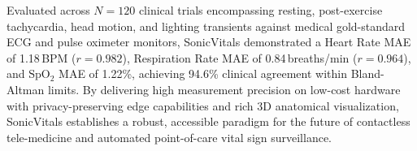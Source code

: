 \documentclass[journal]{IEEEtran}
\begin{document}
Evaluated across $N=120$ clinical trials encompassing resting, post-exercise tachycardia, head motion, and lighting transients against medical gold-standard ECG and pulse oximeter monitors, SonicVitals demonstrated a Heart Rate MAE of 1.18\,BPM ($r = 0.982$), Respiration Rate MAE of 0.84\,breaths/min ($r = 0.964$), and $\mathrm{SpO_2}$ MAE of 1.22\%, achieving 94.6\% clinical agreement within Bland-Altman limits. By delivering high measurement precision on low-cost hardware with privacy-preserving edge capabilities and rich 3D anatomical visualization, SonicVitals establishes a robust, accessible paradigm for the future of contactless tele-medicine and automated point-of-care vital sign surveillance.

\makeatletter
\def\thebibliography#1{\section*{\refname}%
\addcontentsline{toc}{section}{\refname}%
\footnotesize\vskip 0.2\baselineskip%
\list{\@biblabel{\@arabic\c@enumiv}}%
{\settowidth\labelwidth{\@biblabel{#1}}%
\leftmargin\labelwidth
\advance\leftmargin\labelsep\relax
\itemsep -1.4pt\relax
\parsep 0pt\relax
\usecounter{enumiv}%
\let\p@enumiv\@empty
\renewcommand\theenumiv{\@arabic\c@enumiv}}%
\let\@IEEElatexbibitem\bibitem%
\def\bibitem{\@IEEEbibitemprefix\@IEEElatexbibitem}%
\def\newblock{\hskip .11em plus .33em minus .07em}%
\sloppy\clubpenalty4000\widowpenalty4000\interlinepenalty500%
\sfcode`\.=1000\relax}
\makeatother
\end{document}
